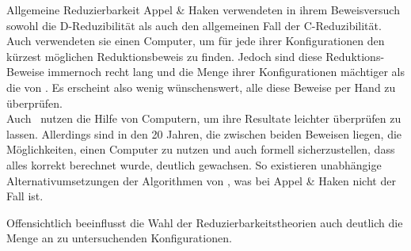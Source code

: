 \begin{section}{Allgemeine Reduzierbarkeit}
 Appel \& Haken verwendeten in ihrem Beweisversuch sowohl die D-Reduzibilität als auch den allgemeinen Fall der C-Reduzibilität. Auch verwendeten sie einen Computer, um für jede ihrer Konfigurationen den kürzest möglichen Reduktionsbeweis zu finden. Jedoch sind diese Reduktions-Beweise immernoch recht lang und die Menge ihrer Konfigurationen mächtiger als die von \rsst. Es erscheint also wenig wünschenswert, alle diese Beweise per Hand zu überprüfen. \\
 Auch \rsst\-\ nutzen die Hilfe von Computern, um ihre Resultate leichter überprüfen zu lassen. Allerdings sind in den 20 Jahren, die zwischen beiden Beweisen liegen, die Möglichkeiten, einen Computer zu nutzen und auch formell sicherzustellen, dass alles korrekt berechnet wurde, deutlich gewachsen. So existieren unabhängige Alternativumsetzungen der Algorithmen von \rsst, was bei Appel \& Haken nicht der Fall ist. 
 
 Offensichtlich beeinflusst die Wahl der Reduzierbarkeitstheorien auch deutlich die Menge an zu untersuchenden Konfigurationen.
\end{section}
